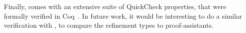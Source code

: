 Finally, \lbxmonad comes with an extensive suite of QuickCheck properties,
that were formally verified in Coq~\cite{Swierstra2012}. In future work,
it would be interesting to do a similar verification with \toolname, 
to compare the refinement types to proof-assistants.


